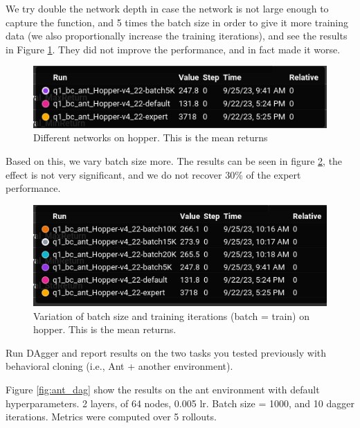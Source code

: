 \documentclass[11pt]{article}
\begin{document}
We try double the network depth in case the network is not large enough to capture the function, 
and 5 times the batch size in order to give it more training data (we also proportionally increase the training iterations), and see the results in Figure \ref{fig:hop2}.
They did not improve the performance, and in fact made it worse.

\begin{figure}[h] 
    \centering
    \includegraphics[width=0.55 \linewidth]{09-25-hop_all}
    \caption{Different networks on hopper. This is the mean returns}
    \label{fig:hop2}
\end{figure}

Based on this, we vary batch size more. 
The results can be seen in figure \ref{fig:hop_batch}, the effect is not very significant, and we do not recover 30\% of the expert performance.
\begin{figure}[h!] 
    \centering
    \includegraphics[width=0.55 \linewidth]{09-25-hop_batch}
    \caption{Variation of batch size and training iterations (batch = train) on hopper. This is the mean returns.}
    \label{fig:hop_batch}
\end{figure}

Run DAgger and report results on the two tasks you tested previously with behavioral cloning
(i.e., Ant + another environment). 

\soln

Figure \ref{fig:ant_dag} show the results on the ant environment with default hyperparameters.
2 layers, of 64 nodes, 0.005 lr. Batch size = 1000, and 10 dagger iterations. Metrics were computed over 5 rollouts.
\end{document}
